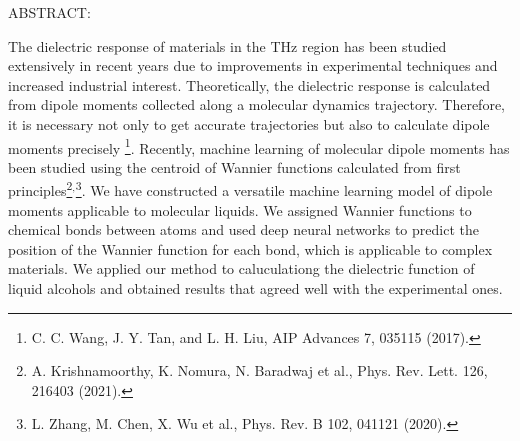 \documentclass[11pt]{article}
\begin{document}







ABSTRACT:



The dielectric response of materials in the THz region has been studied extensively in recent years due to improvements in experimental techniques and increased industrial interest. Theoretically, the dielectric response is calculated
 from dipole moments collected along a molecular dynamics trajectory. Therefore, it is necessary not only to get accurate trajectories but also to calculate dipole moments precisely \footnote{C. C. Wang, J. Y. Tan, and L. H. Liu, AIP Advances 7, 035115 (2017).}. Recently, machine learning of molecular dipole moments has been studied using the centroid of Wannier functions calculated from first principles\footnote{ A. Krishnamoorthy, K. Nomura, N. Baradwaj et al., Phys. Rev. Lett. 126, 216403 (2021).}$^{,}$\footnote{ L. Zhang, M. Chen, X. Wu et al., Phys. Rev. B 102, 041121 (2020).}. We have constructed a versatile machine learning model of dipole moments applicable to molecular liquids. We assigned Wannier functions to chemical bonds between atoms and used deep neural networks to predict the position of the Wannier function for each bond, which is applicable to complex materials. We applied our method to caluculationg the dielectric function of liquid alcohols and obtained results that agreed well with the experimental ones.
\end{document}
